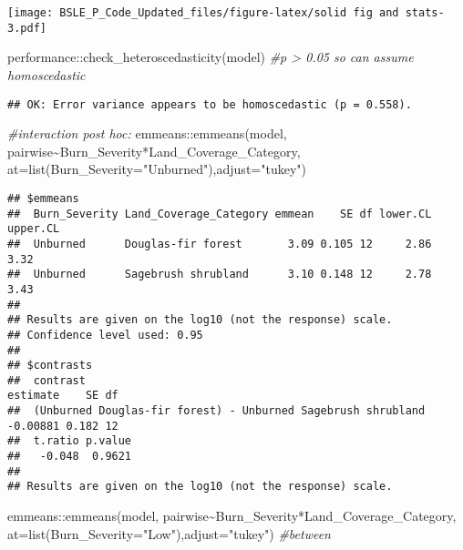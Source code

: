 \documentclass[
]{article}
\newenvironment{Shaded}{\begin{snugshade}}{\end{snugshade}}
\newcommand{\AttributeTok}[1]{\textcolor[rgb]{0.77,0.63,0.00}{#1}}
\newcommand{\CommentTok}[1]{\textcolor[rgb]{0.56,0.35,0.01}{\textit{#1}}}
\newcommand{\FunctionTok}[1]{\textcolor[rgb]{0.00,0.00,0.00}{#1}}
\newcommand{\NormalTok}[1]{#1}
\newcommand{\SpecialCharTok}[1]{\textcolor[rgb]{0.00,0.00,0.00}{#1}}
\newcommand{\StringTok}[1]{\textcolor[rgb]{0.31,0.60,0.02}{#1}}
\begin{document}
\texttt{[image: BSLE\_P\_Code\_Updated\_files/figure-latex/solid fig and stats-3.pdf]}

\begin{Shaded}
\begin{Highlighting}[]
\NormalTok{performance}\SpecialCharTok{::}\FunctionTok{check\_heteroscedasticity}\NormalTok{(model) }\CommentTok{\#p \textgreater{} 0.05 so can assume homoscedastic}
\end{Highlighting}
\end{Shaded}

\begin{verbatim}
## OK: Error variance appears to be homoscedastic (p = 0.558).
\end{verbatim}

\begin{Shaded}
\begin{Highlighting}[]
\CommentTok{\#interaction post hoc: }
\NormalTok{emmeans}\SpecialCharTok{::}\FunctionTok{emmeans}\NormalTok{(model, pairwise}\SpecialCharTok{\textasciitilde{}}\NormalTok{Burn\_Severity}\SpecialCharTok{*}\NormalTok{Land\_Coverage\_Category, }\AttributeTok{at=}\FunctionTok{list}\NormalTok{(}\AttributeTok{Burn\_Severity=}\StringTok{"Unburned"}\NormalTok{),}\AttributeTok{adjust=}\StringTok{"tukey"}\NormalTok{) }
\end{Highlighting}
\end{Shaded}

\begin{verbatim}
## $emmeans
##  Burn_Severity Land_Coverage_Category emmean    SE df lower.CL upper.CL
##  Unburned      Douglas-fir forest       3.09 0.105 12     2.86     3.32
##  Unburned      Sagebrush shrubland      3.10 0.148 12     2.78     3.43
## 
## Results are given on the log10 (not the response) scale. 
## Confidence level used: 0.95 
## 
## $contrasts
##  contrast                                                     estimate    SE df
##  (Unburned Douglas-fir forest) - Unburned Sagebrush shrubland -0.00881 0.182 12
##  t.ratio p.value
##   -0.048  0.9621
## 
## Results are given on the log10 (not the response) scale.
\end{verbatim}

\begin{Shaded}
\begin{Highlighting}[]
\NormalTok{emmeans}\SpecialCharTok{::}\FunctionTok{emmeans}\NormalTok{(model, pairwise}\SpecialCharTok{\textasciitilde{}}\NormalTok{Burn\_Severity}\SpecialCharTok{*}\NormalTok{Land\_Coverage\_Category, }\AttributeTok{at=}\FunctionTok{list}\NormalTok{(}\AttributeTok{Burn\_Severity=}\StringTok{"Low"}\NormalTok{),}\AttributeTok{adjust=}\StringTok{"tukey"}\NormalTok{) }\CommentTok{\#between }
\end{Highlighting}
\end{Shaded}
\end{document}

